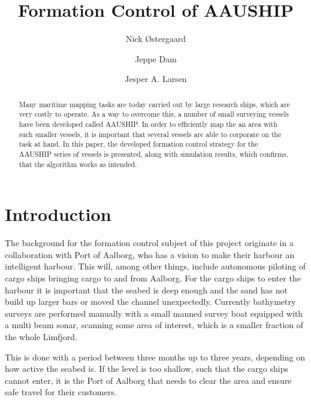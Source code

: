 \documentclass[conference]{IEEEtran}
\begin{document}
\title{\vspace{-2cm}Formation Control of AAUSHIP}
\author{Nick Østergaard \and Jeppe Dam \and Jesper A. Larsen}
\maketitle


\begin{abstract}
Many maritime mapping tasks are today carried out by large research ships, which are very costly to operate. As a way to overcome this, a number of small surveying vessels have been developed called AAUSHIP. In order to efficiently map the an area with such smaller vessels, it is important that several vessels are able to corporate on the task at hand. In this paper, the developed formation control strategy for the AAUSHIP series of vessels is presented, along with simulation results, which confirms, that the algorithm works as intended.
\end{abstract}

\section{Introduction}
The background for the formation control subject of this project
originate in a collaboration with Port of Aalborg, who has a vision to
make their harbour an intelligent harbour. This will, among other
things, include autonomous piloting of cargo ships bringing cargo to and from
Aalborg. For the cargo ships to enter the harbour it is important that
the seabed is deep enough and the sand has not build up larger bars or
moved the channel unexpectedly.  Currently bathymetry surveys are
performed manually with a small manned survey boat equipped with a
multi beam sonar, scanning some area of interest, which is a smaller
fraction of the whole Limfjord.

This is done with a period between three months up to three years,
depending on how active the seabed is. If the level is too shallow,
such that the cargo ships cannot enter, it is the Port of Aalborg that
needs to clear the area and ensure safe travel for their customers.
\end{document}

